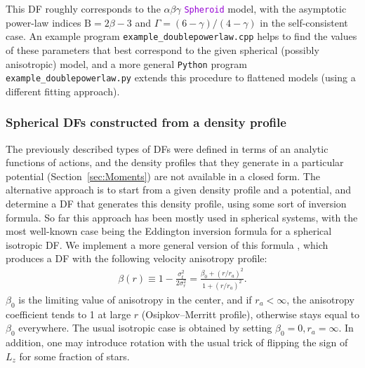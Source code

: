 \documentclass[12pt]{article}
\newcommand{\Python}{\texttt{Python}\xspace}
\newcommand{\ttt}[1]{\textcolor{darkviolet}{\texttt{#1}}}
\newcommand{\Beta}{\mathrm B}
\begin{document}
This DF roughly corresponds to the $\alpha\beta\gamma$ \ttt{Spheroid} model, with the asymptotic power-law indices $\Beta=2\beta-3$ and $\Gamma=(6-\gamma)/(4-\gamma)$ in the self-consistent case. An example program \texttt{example_doublepowerlaw.cpp} helps to find the values of these parameters that best correspond to the given spherical (possibly anisotropic) model, and a more general \Python program \texttt{example_doublepowerlaw.py} extends this procedure to flattened models (using a different fitting approach).


%


\subsubsection{Spherical DFs constructed from a density profile}  \label{sec:DFspherical}

The previously described types of DFs were defined in terms of an analytic functions of actions, and the density profiles that they generate in a particular potential (Section~\ref{sec:Moments}) are not available in a closed form. The alternative approach is to start from a given density profile and a potential, and determine a DF that generates this density profile, using some sort of inversion formula. So far this approach has been mostly used in spherical systems, with the most well-known case being the Eddington inversion formula for a spherical isotropic DF. We implement a more general version of this formula \cite{Cuddeford1991}, which produces a DF with the following velocity anisotropy profile:
\begin{align*}
\beta(r) \equiv 1 - \frac{\sigma_t^2}{2\sigma_r^2} = \frac{\beta_0 + (r/r_a)^2}{1 + (r/r_a)^2}.
\end{align*}
$\beta_0$ is the limiting value of anisotropy in the center, and if $r_a<\infty$, the anisotropy coefficient tends to 1 at large $r$ (Osipkov--Merritt profile), otherwise stays equal to $\beta_0$ everywhere. The usual isotropic case is obtained by setting $\beta_0=0, r_a=\infty$. In addition, one may introduce rotation with the usual trick of flipping the sign of $L_z$ for some fraction of stars.
\end{document}
